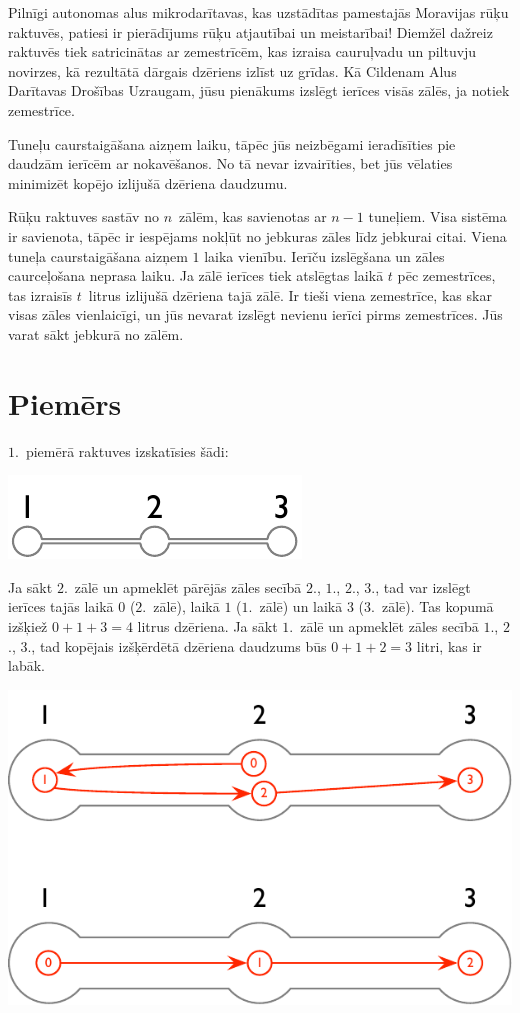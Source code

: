 
\noindent

Pilnīgi autonomas alus mikrodarītavas, kas uzstādītas pamestajās Moravijas rūķu raktuvēs, patiesi ir pierādījums rūķu atjautībai un meistarībai!
Diemžēl dažreiz raktuvēs tiek satricinātas ar zemestrīcēm, kas izraisa cauruļvadu un piltuvju novirzes, kā rezultātā dārgais dzēriens izlīst uz grīdas.
Kā Cildenam Alus Darītavas Drošības Uzraugam, jūsu pienākums izslēgt ierīces visās zālēs, ja notiek zemestrīce.

Tuneļu caurstaigāšana aizņem laiku, tāpēc jūs neizbēgami ieradīsīties pie daudzām ierīcēm ar nokavēšanos.
No tā nevar izvairīties, bet jūs vēlaties minimizēt kopējo izlijušā dzēriena daudzumu.

\medskip
Rūķu raktuves sastāv no $n$~zālēm, kas savienotas ar $n-1$ tuneļiem.
Visa sistēma ir savienota, tāpēc ir iespējams nokļūt no jebkuras zāles līdz jebkurai citai.
Viena tuneļa caurstaigāšana aizņem $1$ laika vienību.
Ierīču izslēgšana un zāles caurceļošana neprasa laiku.
Ja zālē ierīces tiek atslēgtas laikā $t$ pēc zemestrīces, tas izraisīs $t$~litrus izlijušā dzēriena tajā zālē.
Ir tieši viena zemestrīce, kas skar visas zāles vienlaicīgi, un jūs nevarat izslēgt nevienu ierīci pirms zemestrīces.
Jūs varat sākt jebkurā no zālēm.

\section*{Piemērs}

$1$.~piemērā raktuves izskatīsies šādi:

\includegraphics[width=.2\textwidth]{img/sample-1.pdf}

Ja sākt $2$.~zālē un apmeklēt pārējās zāles secībā $2$., $1$., $2$., $3$., tad var izslēgt ierīces tajās laikā $0$ ($2$.~zālē), laikā $1$ ($1$.~zālē) un laikā $3$ ($3$.~zālē).
Tas kopumā izšķiež $0+1+3=4$ litrus dzēriena.
Ja sākt $1$.~zālē un apmeklēt zāles secībā $1$., $2$., $3$., tad kopējais izšķērdētā dzēriena daudzums būs $0+1+2=3$ litri, kas ir labāk.

\includegraphics[width=.4\textwidth]{img/sample-1-ans.pdf}

